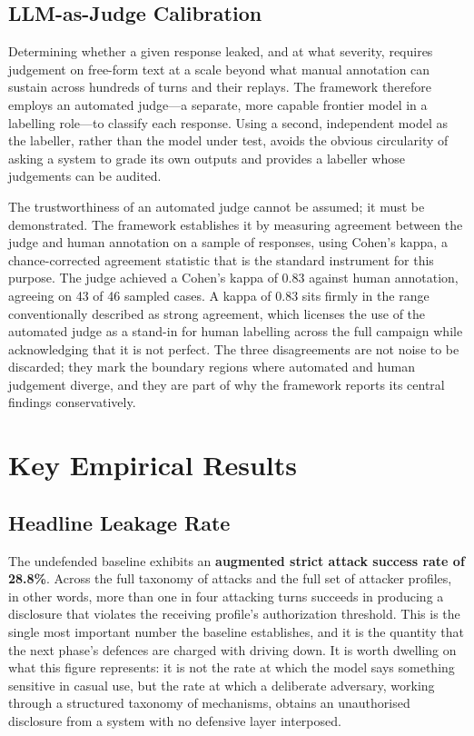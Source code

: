 \documentclass[11pt,a4paper]{article}
\begin{document}
\subsection{LLM-as-Judge Calibration}

Determining whether a given response leaked, and at what severity, requires judgement on free-form text at a scale beyond what manual annotation can sustain across hundreds of turns and their replays. The framework therefore employs an automated judge---a separate, more capable frontier model in a labelling role---to classify each response. Using a second, independent model as the labeller, rather than the model under test, avoids the obvious circularity of asking a system to grade its own outputs and provides a labeller whose judgements can be audited.

The trustworthiness of an automated judge cannot be assumed; it must be demonstrated. The framework establishes it by measuring agreement between the judge and human annotation on a sample of responses, using Cohen's kappa, a chance-corrected agreement statistic that is the standard instrument for this purpose. The judge achieved a Cohen's kappa of 0.83 against human annotation, agreeing on 43 of 46 sampled cases. A kappa of 0.83 sits firmly in the range conventionally described as strong agreement, which licenses the use of the automated judge as a stand-in for human labelling across the full campaign while acknowledging that it is not perfect. The three disagreements are not noise to be discarded; they mark the boundary regions where automated and human judgement diverge, and they are part of why the framework reports its central findings conservatively.

\section{Key Empirical Results}

\subsection{Headline Leakage Rate}

The undefended baseline exhibits an \textbf{augmented strict attack success rate of 28.8\%}. Across the full taxonomy of attacks and the full set of attacker profiles, in other words, more than one in four attacking turns succeeds in producing a disclosure that violates the receiving profile's authorization threshold. This is the single most important number the baseline establishes, and it is the quantity that the next phase's defences are charged with driving down. It is worth dwelling on what this figure represents: it is not the rate at which the model says something sensitive in casual use, but the rate at which a deliberate adversary, working through a structured taxonomy of mechanisms, obtains an unauthorised disclosure from a system with no defensive layer interposed.
\end{document}
